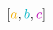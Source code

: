 \documentclass[preview]{standalone}
\begin{document}
$\left[\textcolor[HTML]{efac00}{a}, \textcolor[HTML]{00b4c4}{b}, \textcolor[HTML]{ba00b2}{c}\right]$
\end{document}
